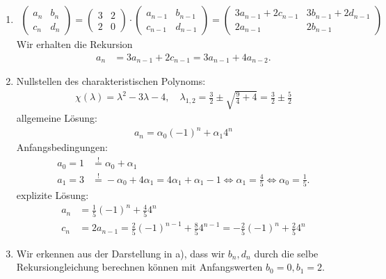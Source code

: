 \begin{solution}
\phantom{}
\begin{enumerate}[label = \alph*)]
  \item
  \begin{align*}
    \begin{pmatrix}a_n & b_n \\ c_n & d_n\end{pmatrix}
    = \begin{pmatrix}3 & 2 \\ 2 & 0\end{pmatrix}\cdot
    \begin{pmatrix}a_{n-1} & b_{n-1} \\ c_{n-1} & d_{n-1}\end{pmatrix}
    = \begin{pmatrix}
      3a_{n-1} + 2c_{n-1} & 3b_{n-1} + 2d_{n-1} \\ 2a_{n-1} & 2b_{n-1}
    \end{pmatrix}
  \end{align*}
  Wir erhalten die Rekursion
  \begin{align*}
    a_n &= 3a_{n-1} + 2c_{n-1} = 3a_{n-1} + 4a_{n-2}.
  \end{align*}
  \item Nullstellen des charakteristischen Polynoms:
  \begin{align*}
    \chi(\lambda) = \lambda^2 - 3\lambda - 4, \quad \lambda_{1,2} = \frac{3}{2} \pm \sqrt{\frac{9}{4} + 4}
    = \frac{3}{2} \pm \frac{5}{2}
  \end{align*}
  allgemeine Lösung:
  \begin{align*}
    a_n = \alpha_0(-1)^n + \alpha_1 4^n
  \end{align*}
  Anfangsbedingungen:
  \begin{align*}
    a_0 = 1 &\stackrel{!}{=} \alpha_0 + \alpha_1 \\
    a_1 = 3 &\stackrel{!}{=} -\alpha_0 + 4\alpha_1 = 4\alpha_1 + \alpha_1 - 1 \iff \alpha_1 = \frac{4}{5}
    \iff \alpha_0 = \frac{1}{5}.
  \end{align*}
  explizite Lösung:
  \begin{align*}
    a_n &= \frac{1}{5}(-1)^n  + \frac{4}{5}4^n \\
    c_n &= 2a_{n-1} = \frac{2}{5}(-1)^{n-1} + \frac{8}{5}4^{n-1} = -\frac{2}{5}(-1)^n + \frac{2}{5}4^n
  \end{align*}
  \item Wir erkennen aus der Darstellung in a), dass wir $b_n, d_n$ durch die
  selbe Rekursiongleichung berechnen können mit Anfangswerten $b_0 = 0, b_1 = 2$.

\end{enumerate}
\end{solution}
